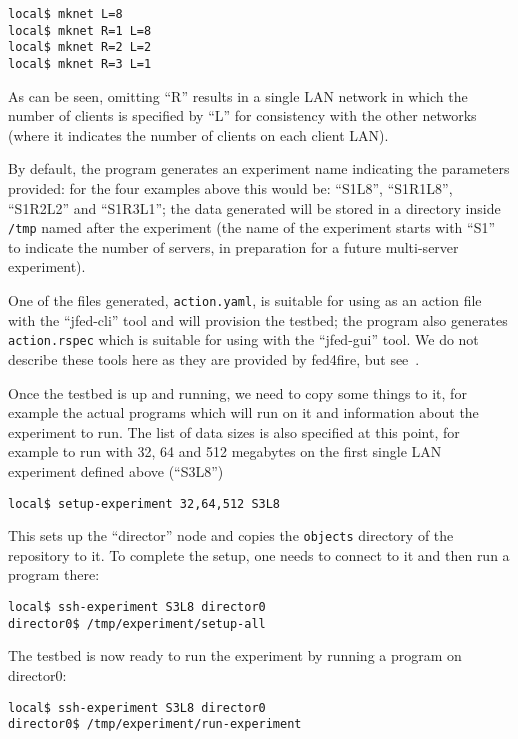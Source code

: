 \documentclass[a4paper,12pt]{article}
\begin{document}
\begin{verbatim}
local$ mknet L=8
local$ mknet R=1 L=8
local$ mknet R=2 L=2
local$ mknet R=3 L=1
\end{verbatim}

As can be seen, omitting ``R'' results in a single LAN network in which
the number of clients is specified by ``L'' for consistency with the
other networks (where it indicates the number of clients on each client
LAN).

By default, the program generates an experiment name indicating the
parameters provided: for the four examples above this would be: ``S1L8'',
``S1R1L8'', ``S1R2L2'' and ``S1R3L1''; the data generated will be stored
in a directory inside {\tt/tmp} named after the experiment (the name
of the experiment starts with ``S1'' to indicate the number of servers,
in preparation for a future multi-server experiment).

One of the files generated, {\tt action.yaml}, is suitable for using as
an action file with the ``jfed-cli'' tool and will provision the testbed;
the program also generates {\tt action.rspec} which is suitable for
using with the ``jfed-gui'' tool.  We do not describe these tools here
as they are provided by fed4fire, but see~\cite{jfed}.

Once the testbed is up and running, we need to copy some things to it,
for example the actual programs which will run on it and information about
the experiment to run.  The list of data sizes is also specified at
this point, for example to run with 32, 64 and 512 megabytes on the
first single LAN experiment defined above (``S3L8'')

\begin{verbatim}
local$ setup-experiment 32,64,512 S3L8
\end{verbatim}

This sets up the ``director'' node and copies the {\tt objects} directory
of the repository to it.  To complete the setup, one needs to connect to
it and then run a program there:

\begin{verbatim}
local$ ssh-experiment S3L8 director0
director0$ /tmp/experiment/setup-all
\end{verbatim}

The testbed is now ready to run the experiment by running a program on
director0:

\begin{verbatim}
local$ ssh-experiment S3L8 director0
director0$ /tmp/experiment/run-experiment
\end{verbatim}
\end{document}

